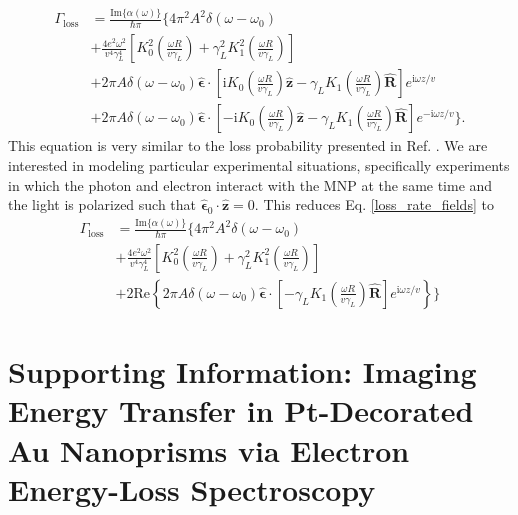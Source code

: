 \documentclass [11pt, proquest] {uwthesis}[2016/11/22]
\begin{document}
\begin{equation}
\begin{aligned}
\Gamma_{\textrm{loss}} &= \frac{\textrm{Im}\{\alpha(\omega)\}}{\hbar\pi}\Big\{4\pi^2A^2\delta(\omega-\omega_0)\\
&+ \frac{4e^2\omega^2}{v^4\gamma_L^4}\left[K_0^2\left(\frac{\omega R}{v\gamma_L}\right) + \gamma_L^2 K_1^2\left(\frac{\omega R}{v\gamma_L}\right)\right]\\
&+ 2\pi A\delta(\omega-\omega_0)\hat{\boldsymbol{\epsilon}}\cdot\left[ \textrm{i}K_0\left( \frac{\omega R}{v\gamma_L} \right)\hat{\textbf{z}} - \gamma_L K_1\left( \frac{\omega R}{v\gamma_L} \right)\hat{\textbf{R}}\right]e^{\textrm{i}\omega z/v}\\
&+ 2\pi A\delta(\omega-\omega_0)\hat{\boldsymbol{\epsilon}}\cdot\left[ -\textrm{i}K_0\left( \frac{\omega R}{v\gamma_L} \right)\hat{\textbf{z}} - \gamma_L K_1\left( \frac{\omega R}{v\gamma_L} \right)\hat{\textbf{R}}\right]e^{-\textrm{i}\omega z/v} \Big\}.
\label{loss_rate_fields}
\end{aligned}
\end{equation}
This equation is very similar to the loss probability presented in Ref. \cite{vanAiken}. We are interested in modeling particular experimental situations, specifically experiments in which the photon and electron interact with the MNP at the same time and the light is polarized such that $\hat{\boldsymbol{\epsilon}}_0 \cdot \hat{\textbf{z}} = 0$. This reduces Eq. \ref{loss_rate_fields} to
\begin{equation}
\begin{aligned}
\Gamma_{\textrm{loss}} &= \frac{\textrm{Im}\{\alpha(\omega)\}}{\hbar\pi}\Big\{4\pi^2A^2\delta(\omega-\omega_0)\\
&+ \frac{4e^2\omega^2}{v^4\gamma_L^4}\left[K_0^2\left(\frac{\omega R}{v\gamma_L}\right) + \gamma_L^2 K_1^2\left(\frac{\omega R}{v\gamma_L}\right)\right]\\
&+ 2\textrm{Re}\left\{2\pi A\delta(\omega-\omega_0)\hat{\boldsymbol{\epsilon}}\cdot\left[ -\gamma_L K_1\left( \frac{\omega R}{v\gamma_L} \right)\hat{\textbf{R}}\right]e^{\textrm{i}\omega z/v}\right\}\Big\}
\label{loss_fields_realpart}
\end{aligned}
\end{equation}




%
\appendix
\raggedbottom\sloppy
 
\chapter{Supporting Information: Imaging Energy Transfer in Pt-Decorated Au Nanoprisms via Electron Energy-Loss Spectroscopy}
\end{document}
